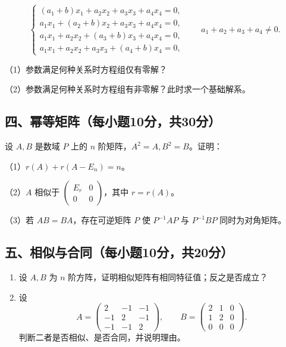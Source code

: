 \documentclass[11pt,fontset=fandol]{ctexart}
\begin{document}
\[
\begin{cases}
(a_1+b)x_1+a_2x_2+a_3x_3+a_4x_4=0,\\
a_1x_1+(a_2+b)x_2+a_3x_3+a_4x_4=0,\\
a_1x_1+a_2x_2+(a_3+b)x_3+a_4x_4=0,\\
a_1x_1+a_2x_2+a_3x_3+(a_4+b)x_4=0,
\end{cases}
\qquad a_1+a_2+a_3+a_4\ne0.
\]

（1）参数满足何种关系时方程组仅有零解？

（2）参数满足何种关系时方程组有非零解？此时求一个基础解系。

\subsection{四、幂等矩阵（每小题10分，共30分）}\label{ux56dbux5e42ux7b49ux77e9ux9635ux6bcfux5c0fux989810ux5206ux517130ux5206}

设 \(A,B\) 是数域 \(P\) 上的 \(n\) 阶矩阵，\(A^2=A,B^2=B\)。证明：

（1）\(r(A)+r(A-E_n)=n\)。

（2）\(A\) 相似于 \(\begin{pmatrix}E_r&0\\0&0\end{pmatrix}\)，其中
\(r=r(A)\)。

（3）若 \(AB=BA\)，存在可逆矩阵 \(P\) 使 \(P^{-1}AP\) 与 \(P^{-1}BP\)
同时为对角矩阵。

\subsection{五、相似与合同（每小题10分，共20分）}\label{ux4e94ux76f8ux4f3cux4e0eux5408ux540cux6bcfux5c0fux989810ux5206ux517120ux5206}

\begin{enumerate}
\def\labelenumi{\arabic{enumi}.}
\item
  设 \(A,B\) 为 \(n\) 阶方阵，证明相似矩阵有相同特征值；反之是否成立？
\item
  设 \[
  A=\begin{pmatrix}2&-1&-1\\-1&2&-1\\-1&-1&2\end{pmatrix},\qquad
  B=\begin{pmatrix}2&1&0\\1&2&0\\0&0&0\end{pmatrix}.
  \] 判断二者是否相似、是否合同，并说明理由。
\end{enumerate}
\end{document}
